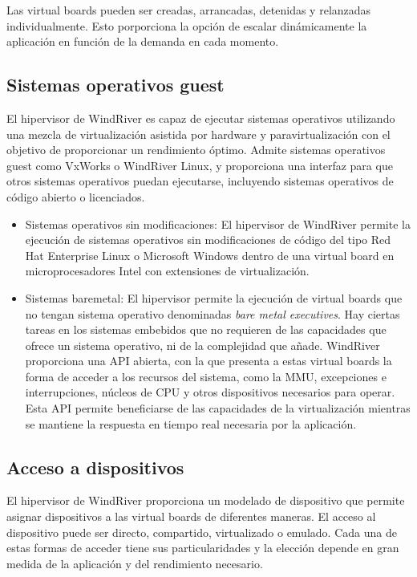 Las virtual boards pueden ser creadas, arrancadas, detenidas y relanzadas individualmente. Esto porporciona la opción de escalar dinámicamente la aplicación en función de la demanda en cada momento.

\subsection{Sistemas operativos guest}
El hipervisor de WindRiver es capaz de ejecutar sistemas operativos utilizando una mezcla de virtualización asistida por hardware y paravirtualización con el objetivo de proporcionar un rendimiento óptimo. Admite sistemas operativos guest como VxWorks o WindRiver Linux, y proporciona una interfaz para que otros sistemas operativos puedan ejecutarse, incluyendo sistemas operativos de código abierto o licenciados.\\

\begin {itemize}
\item Sistemas operativos sin modificaciones: El hipervisor de WindRiver permite la ejecución de sistemas operativos sin modificaciones de código del tipo Red Hat Enterprise Linux o Microsoft Windows dentro de una virtual board en microprocesadores Intel con extensiones de virtualización.\\

\item Sistemas baremetal: El hipervisor permite la ejecución de virtual boards que no tengan sistema operativo denominadas \textit{bare metal executives}. Hay ciertas tareas en los sistemas embebidos que no requieren de las capacidades que ofrece un sistema operativo, ni de la complejidad que añade. WindRiver proporciona una \acrshort{API} abierta, con la que presenta a estas virtual boards la forma de acceder a los recursos del sistema, como la \acrshort{MMU}, excepciones e interrupciones, núcleos de CPU y otros dispositivos necesarios para operar. Esta \acrshort{API} permite beneficiarse de las capacidades de la virtualización mientras se mantiene la respuesta en tiempo real necesaria por la aplicación.
\end{itemize}

\subsection{Acceso a dispositivos}
El hipervisor de WindRiver proporciona un modelado de dispositivo que permite asignar dispositivos a las virtual boards de diferentes maneras. El acceso al dispositivo puede ser directo, compartido, virtualizado o emulado. Cada una de estas formas de acceder tiene sus particularidades y la elección depende en gran medida de la aplicación y del rendimiento necesario.

